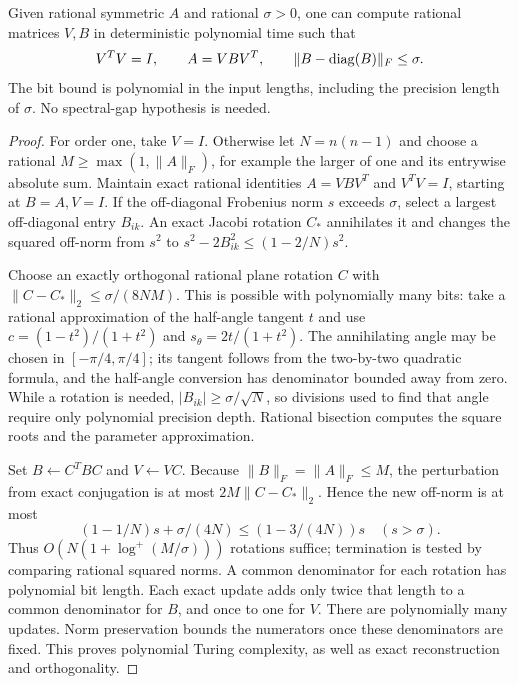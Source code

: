 \begin{lemma}\label{lem:rational-jacobi}
Given rational symmetric $A$ and rational $\sigma>0$, one can compute
rational matrices $V,B$ in deterministic polynomial time such that
\[
 V^TV=I,\qquad A=VBV^T,\qquad
 \|B-\operatorname{diag}(B)\|_F\le\sigma.
\]
The bit bound is polynomial in the input lengths, including the precision
length of $\sigma$. No spectral-gap hypothesis is needed.
\end{lemma}
\begin{proof}
For order one, take $V=I$. Otherwise let $N=n(n-1)$ and choose a rational
$M\ge\max(1,\|A\|_F)$, for example the larger of one and its entrywise
absolute sum. Maintain exact rational identities $A=VBV^T$ and $V^TV=I$,
starting at $B=A,V=I$. If the off-diagonal Frobenius norm $s$ exceeds
$\sigma$, select a largest off-diagonal entry $B_{ik}$. An exact
Jacobi rotation $C_*$ annihilates it and changes the squared off-norm
from $s^2$ to $s^2-2B_{ik}^2\le(1-2/N)s^2$.

Choose an exactly orthogonal rational plane rotation $C$ with
$\|C-C_*\|_2\le\sigma/(8NM)$. This is possible with polynomially many
bits: take a rational approximation of the half-angle tangent $t$ and
use $c=(1-t^2)/(1+t^2)$ and $s_\theta=2t/(1+t^2)$. The annihilating
angle may be chosen in $[-\pi/4,\pi/4]$; its tangent follows from the
two-by-two quadratic formula, and the half-angle conversion has denominator
bounded away from zero. While a rotation is needed,
$|B_{ik}|\ge\sigma/\sqrt N$, so divisions used to find that angle require
only polynomial precision depth. Rational bisection computes the square
roots and the parameter approximation.

Set $B\leftarrow C^TBC$ and $V\leftarrow VC$. Because
$\|B\|_F=\|A\|_F\le M$, the perturbation from exact conjugation is at
most $2M\|C-C_*\|_2$. Hence the new off-norm is at most
\[
 (1-1/N)s+\sigma/(4N)\le(1-3/(4N))s \quad(s>\sigma).
\]
Thus $O(N(1+\log^+(M/\sigma)))$ rotations suffice; termination is tested
by comparing rational squared norms. A common denominator for each
rotation has polynomial bit length. Each exact update adds only twice
that length to a common denominator for $B$, and once to one for $V$.
There are polynomially many updates. Norm preservation bounds the
numerators once these denominators are fixed. This proves polynomial
Turing complexity, as well as exact reconstruction and orthogonality.
\end{proof}


